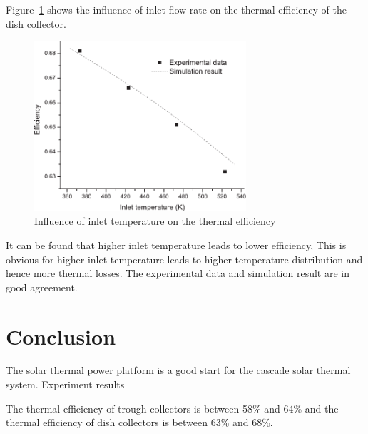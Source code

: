 Figure~\ref{fig:T_i-eta} shows the influence of inlet flow rate on the thermal efficiency of the dish collector.
\begin{figure}[!ht]
\centering
\includegraphics[width=0.7\textwidth]{fig/T_i-eta}
\caption{Influence of inlet temperature on the thermal efficiency}
\label{fig:T_i-eta}
\end{figure}

It can be found that higher inlet temperature leads to lower efficiency, This is obvious for higher inlet temperature leads to higher temperature distribution and hence more thermal losses. The experimental data and simulation result are in good agreement.

\section{Conclusion}
The solar thermal power platform is a good start for the cascade solar thermal system.
Experiment results

The thermal efficiency of trough collectors is between 58\% and 64\% and the thermal efficiency of dish collectors is between 63\% and 68\%.